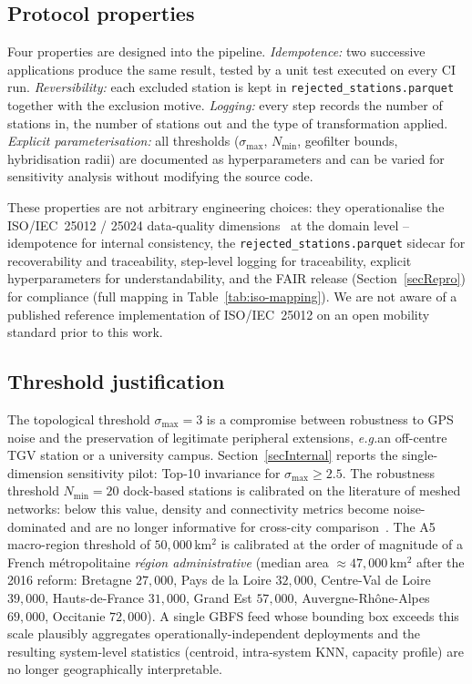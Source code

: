 \documentclass[11pt,a4paper]{article}
\newcommand{\eg}{\emph{e.g.}}
\begin{document}
\subsection{Protocol properties}
Four properties are designed into the pipeline. \emph{Idempotence:} two
successive applications produce the same result, tested by a unit test
executed on every CI run. \emph{Reversibility:} each excluded station
is kept in \texttt{rejected\_stations.parquet} together with the
exclusion motive. \emph{Logging:} every step records the number of
stations in, the number of stations out and the type of transformation
applied. \emph{Explicit parameterisation:} all thresholds
($\sigma_{\max}$, $N_{\min}$, geofilter bounds, hybridisation radii)
are documented as hyperparameters and can be varied for sensitivity
analysis without modifying the source code.

These properties are not arbitrary engineering choices: they
operationalise the ISO/IEC~25012 / 25024 data-quality
dimensions~\cite{ISO25012,ISO25024} at the domain level -- idempotence for
internal consistency, the \texttt{rejected\_stations.parquet} sidecar for
recoverability and traceability, step-level logging for traceability,
explicit hyperparameters for understandability, and the FAIR release
(Section~\ref{secRepro}) for compliance (full mapping in
Table~\ref{tab:iso-mapping}). We are not aware of a published reference
implementation of ISO/IEC~25012 on an open mobility standard prior to this
work.

\subsection{Threshold justification}
The topological threshold $\sigma_{\max} = 3$ is a compromise between
robustness to GPS noise and the preservation of legitimate peripheral
extensions, \eg an off-centre TGV station or a university campus.
Section~\ref{secInternal} reports the single-dimension sensitivity
pilot: Top-10 invariance for $\sigma_{\max} \ge 2.5$. The robustness
threshold $N_{\min} = 20$ dock-based stations is calibrated on the
literature of meshed networks: below this value, density and
connectivity metrics become noise-dominated and are no longer
informative for cross-city comparison~\cite{Saberi2018}. The A5
macro-region threshold of $50{,}000$\,km$^2$ is calibrated at the
order of magnitude of a French métropolitaine
\emph{région administrative} (median area $\approx 47{,}000$\,km$^2$
after the 2016 reform: Bretagne $27{,}000$, Pays de la Loire
$32{,}000$, Centre-Val de Loire $39{,}000$, Hauts-de-France
$31{,}000$, Grand Est $57{,}000$, Auvergne-Rhône-Alpes $69{,}000$,
Occitanie $72{,}000$). A single GBFS feed whose bounding box
exceeds this scale plausibly aggregates operationally-independent
deployments and the resulting system-level statistics
(centroid, intra-system KNN, capacity profile) are no longer
geographically interpretable.
\end{document}
